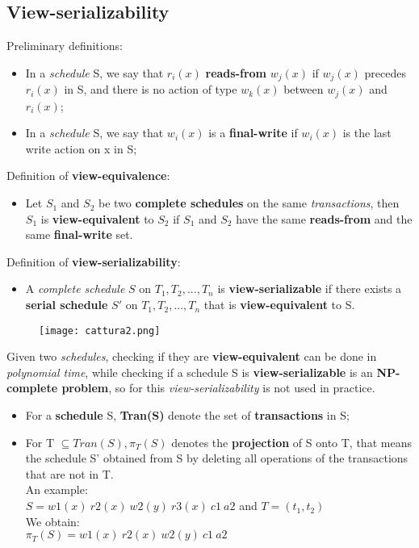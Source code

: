 \documentclass{article}
\begin{document}
\subsection{View-serializability}
Preliminary definitions:
\begin{itemize}
\item In a \emph{schedule} S, we say that $r_{i}(x)$ \textbf{reads-from} $w_{j}(x)$ if $w_{j}(x)$ precedes  $r_{i}(x)$ in S, and there is no action of type $w_{k}(x)$ between $w_{j}(x)$ and $r_{i}(x)$;
\item In a \emph{schedule} S, we say that $w_{i}(x)$ is a \textbf{final-write} if $w_{i}(x)$ is the last write action on x in S;
\end{itemize}
Definition of \textbf{view-equivalence}:
\begin{itemize}
\item Let $S_{1}$ and $S_{2}$ be two \textbf{complete schedules} on the same \emph{transactions}, then $S_{1}$ is \textbf{view-equivalent} to $S_{2}$ if $S_{1}$ and $S_{2}$ have the same \textbf{reads-from} and the same \textbf{final-write} set.
\end{itemize}
Definition of \textbf{view-serializability}:
\begin{itemize}
\item A \emph{complete schedule} $S$ on $T_{1}, T_{2}, ..., T_{n}$ is \textbf{view-serializable} if there exists a \textbf{serial schedule} $S'$ on $T_{1}, T_{2}, ..., T_{n}$ that is \textbf{view-equivalent} to S.
\end{itemize}
\begin{figure}[H]
  \centering
  \texttt{[image: cattura2.png]}
\end{figure}
Given two \emph{schedules}, checking if they are\textbf{ view-equivalent} can be done in \emph{polynomial time}, while checking if a schedule S is \textbf{view-serializable} is an \textbf{NP-complete problem}, so for this \emph{view-serializability} is not used in practice.
\begin{itemize}
\item For a \textbf{schedule} S, \textbf{Tran(S)} denote the set of \textbf{transactions} in S;
\item For T $\subseteq Tran(S), \pi_{T}(S)$ denotes the \textbf{projection} of S onto T, that means the schedule S' obtained from S by deleting all operations of the transactions that are not in T.\\ An example: \\
$S= w1(x)\ r2(x)\ w2(y)\ r3(x)\ c1\ a2$ and $T=(t_1,t_2)$\\
We obtain:\\
$\pi_{T}(S)=  w1(x)\ r2(x)\ w2(y)\ c1\ a2$
\end{itemize}
\end{document}
